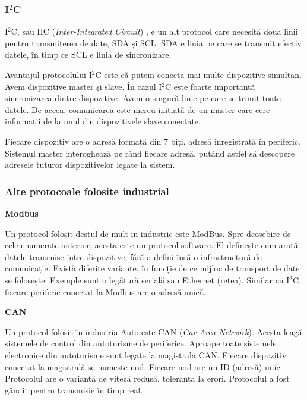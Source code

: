 \subsubsection{I$^2$C}
\label{sec:embed:bus:wired:i2c}

I$^2$C, sau IIC (\textit{Inter-Integrated Circuit}) , e un
alt protocol care necesită două linii pentru transmiterea de date, SDA și SCL.
SDA e linia pe care se transmit efectiv datele, în timp ce SCL e linia de
sincronizare.

Avantajul protocolului I$^2$C este că putem conecta mai multe dispozitive simultan.
Avem dispozitive master și slave. În cazul I$^2$C este foarte importantă
sincronizarea dintre dispozitive. Avem o singură linie pe care se trimit toate
datele. De aceea, comunicarea este mereu inițiată de un master care cere
informații de la unul din dispozitivele slave conectate.

Fiecare dispozitiv are o adresă formată din 7 biți, adresă înregistrată în
periferic. Sistemul master interoghează pe rând fiecare adresă, putând astfel să
descopere adresele tuturor dispozitivelor legate la sistem.

\subsubsection{Alte protocoale folosite industrial}
\label{sec:embed:bus:wired:other}

\textbf{Modbus}

Un protocol folosit destul de mult in industrie este ModBus. Spre deosebire de
cele enumerate anterior, acesta este un protocol software. El definește cum
arată datele transmise între dispozitive, fără a defini însă o infrastructură
de comunicație. Există diferite variante, în funcție de ce mijloc de transport
de date se folosește. Exemple sunt o legătură serială sau Ethernet (rețea).
Similar cu I$^2$C, fiecare periferic conectat la Modbus are o adresă unică.

\textbf{CAN}

Un protocol folosit în industria Auto este CAN (\textit{Car Area Network}). Acesta leagă sistemele de control
din autoturisme de periferice. Aproape toate sistemele electronice din
autoturisme sunt legate la magistrala CAN. Fiecare
dispozitiv conectat la magistrală se numește nod. Fiecare nod are un ID (adresă)
unic. Protocolul are o variantă de viteză redusă, tolerantă la
erori. Protocolul a fost gândit pentru transmisie în timp real.

